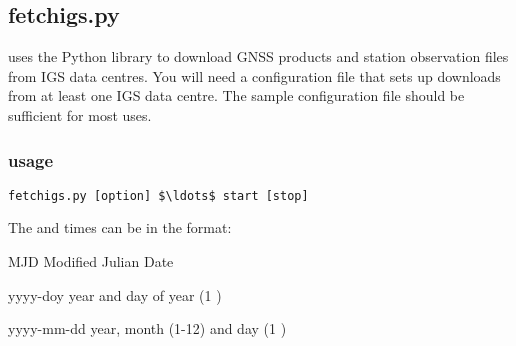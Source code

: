 \subsection{fetchigs.py}

\hypertarget{h:fetchigs}{}

 uses the Python library  to download GNSS products and station observation
files from IGS data centres. You will need a configuration file that sets up downloads from at least one IGS data
centre. The sample configuration file should be sufficient for most uses.

\subsubsection{usage}

\begin{lstlisting}[mathescape=true]
fetchigs.py [option] $\ldots$ start [stop]
\end{lstlisting}

The  and  times can be in the format:
\begin{description*}
\item[MJD] Modified Julian Date
\item[yyyy-doy] year and day of year (1 \textellipsis)
\item[yyyy-mm-dd] year, month (1-12) and day (1 \textellipsis)
\end{description*}

